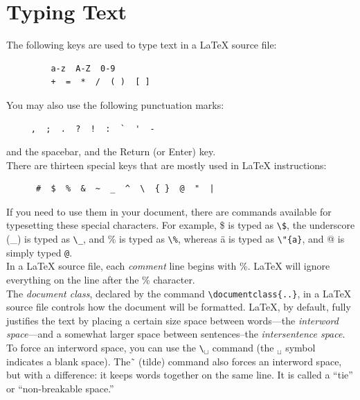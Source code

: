 \documentclass[12pt]{article}
\begin{document}
\section{Typing Text}
The following keys are used to type text in a \LaTeX \; source file:
\begin{center}
    \begin{verbatim}
         a-z  A-Z  0-9
         +  =  *  /  ( )  [ ]
   \end{verbatim}
\end{center}
You may also use the following punctuation marks:
\begin{center}
    \begin{verbatim}
     ,  ;  .  ?  !  :  `  '  -
   \end{verbatim}
\end{center}
and the spacebar, and the Return (or Enter) key.\\

There are thirteen special keys that are mostly used in \LaTeX \; instructions:
\begin{center}
    \begin{verbatim}
      #  $  %  &  ~  _  ^  \  { }  @  "  |
   \end{verbatim}
\end{center}
If you need to use them in your document, there  are commands available for typesetting these special characters. For example, \$ is typed as \verb+\$+, the underscore (\_) is typed as \verb+\_+, and \% is typed as \verb+\%+, whereas \"{a} is typed as \verb+\"{a}+, and @ is simply typed \verb+@+.\\

In a \LaTeX \; source file, each \emph{comment} line begins with \%. \LaTeX \;  will ignore everything on the line after the \% character. \\

The \emph{document class}, declared by the command \verb+\documentclass{..}+, in a \LaTeX \; source file controls how the document will be formatted. \LaTeX, by default, fully justifies the text by placing a certain size space between words---the \emph{interword space}---and a somewhat larger space between sentences--the \emph{intersentence space}.  To force an interword space, you can use the \verb+\+$_{\sqcup}$ command (the $_{\sqcup}$ symbol indicates a blank space). The \~ \, (tilde) command also forces an interword space, but with a difference: it keeps words together on the same line.  It is called a ``tie'' or ``non-breakable space.''\\
\end{document}
